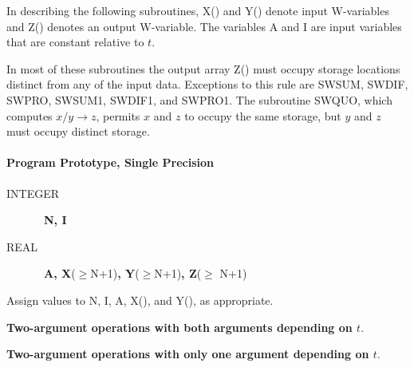 \documentclass[twoside]{MATH77}
\begin{document}
In describing the following subroutines, X() and Y() denote input
W-variables and Z() denotes an output W-variable. The variables A and I are
input variables that are constant relative to $t.$

In most of these subroutines the output array Z() must occupy storage
locations distinct from any of the input data. Exceptions to this rule are
SWSUM, SWDIF, SWPRO, SWSUM1, SWDIF1, and SWPRO1. The subroutine SWQUO, which
computes $x/y \rightarrow z$, permits $x$ and $z$ to occupy the same
storage, but $y$ and $z$ must occupy distinct storage.

\paragraph{Program Prototype, Single Precision}

\begin{description}
\item[INTEGER]  \ {\bf N, I}

\item[REAL]  \ {\bf A, X}($\geq $N+1){\bf , Y}($\geq $N+1){\bf , Z}($\geq $%
N+1)
\end{description}

Assign values to N, I, A, X(), and Y(), as appropriate.

\begin{center}
{\bf Two-argument operations with both arguments depending on $t.$}

\end{center}

\pagebreak

\begin{center}
{\bf Two-argument operations with only one argument depending on $t.$}

\end{center}
\end{document}
